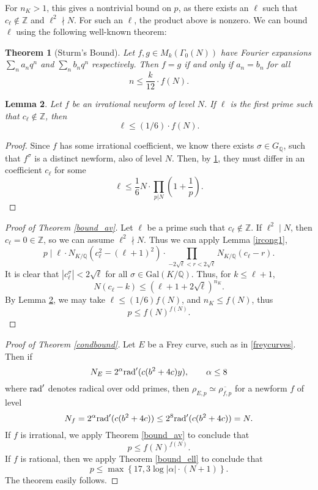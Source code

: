 \documentclass[12pt]{amsart}
\newtheorem{thm}{Theorem}[section]
\newtheorem{lem}[thm]{Lemma}
\theoremstyle{definition}
\def\Q{{\mathbb Q}}
\def\Z{{\mathbb Z}}
\newcommand{\rad}{\rm rad}
\renewcommand{\bar}{\overline}
\newcommand{\notdiv}{\nmid}
\newcommand{\Gal}{\text{Gal}}
\begin{document}
For $n_K > 1$, this gives a nontrivial bound on $p$, as there exists an $\ell$ such that $c_\ell \notin \mathbb{Z}$ and $\ell^2 \nmid N$. For such an $\ell$, the product above is nonzero. We can bound $\ell$ using the following well-known theorem:
\begin{thm}[Sturm's Bound]\label{sturm}
Let $f,g \in M_k(\Gamma_0(N))$ have Fourier expansions $\sum_n a_nq^n$ and $\sum_n b_n q^n$ respectively.  Then $f = g$ if and only if $a_n = b_n$ for all
\[ n \leq \frac{k}{12} \cdot f(N). \]
\end{thm}

\begin{lem}\label{boundell}
Let $f$ be an irrational newform of level $N$.  If $\ell$ is the first prime such that $c_\ell \not\in \Z$, then
\[ \ell \leq (1/6) \cdot f(N) .\]
\end{lem}

\begin{proof}
Since $f$ has some irrational coefficient, we know there exists $\sigma \in G_\Q$, such that $f^{\sigma}$ is a distinct newform, also of level $N$.  Then, by \ref{sturm}, they must differ in an coefficient $c_\ell$ for some 
\[ \ell \leq \frac{1}{6} N \cdot \prod_{p|N} \left(1 + \frac{1}{p} \right). \]
\end{proof}

\begin{proof}[Proof of Theorem \ref{bound_av}]
Let $\ell$ be a prime such that $c_\ell \notin \Z$.  If $\ell^2 \mid N$, then $c_\ell = 0 \in \Z$, so we can assume $\ell^2 \notdiv N$. Thus we can apply Lemma \ref{ircong1}, 
\[ p \mid \ell \cdot N_{K / \mathbb{Q}}(c_\ell^2-(\ell+1)^2) \cdot \prod_{-2\sqrt{\ell} < r < 2\sqrt{\ell}}{N_{K / \mathbb{Q}}}(c_\ell - r).\]
It is clear that $|c_\ell^{\sigma}| < 2\sqrt{\ell}$ for all $\sigma \in \Gal(K/\Q)$. Thus, for $k \leq \ell+1$, \[N(c_\ell - k) \leq (\ell+1 + 2\sqrt{\ell})^{n_{K}}.\] 
By Lemma \ref{boundell}, we may take $\ell \leq (1/6)f(N)$, and $n_{K} \leq f(N)$, thus
\[ p \leq f(N)^{f(N)}. \]
\end{proof}
 
 
 \begin{proof}[Proof of Theorem \ref{condbound}]
 Let $E$ be a Frey curve, such as in \ref{freycurves}.  Then if
 \[N_E = 2^\alpha {\rad}'(c(b^2+4c)y), \qquad \alpha \leq 8\]
where ${\rad}'$ denotes radical over odd primes, then $\rho_{E,p} \simeq \bar{\rho_{f,p}}$ for a newform $f$ of level
\[N_f =  2^\alpha {\rad}'(c(b^2+4c))\leq 2^8  {\rad}'(c(b^2+4c)) = N.\]
 If $f$ is irrational, we apply Theorem \ref{bound_av} to conclude that
 \[ p \leq f(N)^{f(N)}. \]
 If $f$ is rational, then we apply Theorem \ref{bound_ell} to conclude that
 \[ p \leq \max\left\{ 17, 3 \log|\alpha| \cdot (N+1) \right\}. \]
 The theorem easily follows.
 \end{proof}
 
\end{document}

